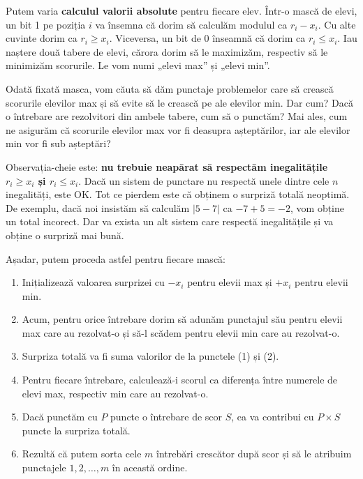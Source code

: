 \documentclass[../main.tex]{subfiles}
\begin{document}
Putem varia \textbf{calculul valorii absolute} pentru fiecare elev. Într-o mască de elevi, un bit 1 pe poziția $i$ va însemna că dorim să calculăm modulul ca $r_i - x_i$. Cu alte cuvinte dorim ca $r_i \geq x_i$. Viceversa, un bit de 0 înseamnă că dorim ca $r_i \leq x_i$. Iau naștere două tabere de elevi, cărora dorim să le maximizăm, respectiv să le minimizăm scorurile. Le vom numi „elevi max” și „elevi min”.

Odată fixată masca, vom căuta să dăm punctaje problemelor care să crească scorurile elevilor max și să evite să le crească pe ale elevilor min. Dar cum? Dacă o întrebare are rezolvitori din ambele tabere, cum să o punctăm? Mai ales, cum ne asigurăm că scorurile elevilor max vor fi deasupra așteptărilor, iar ale elevilor min vor fi sub așteptări?

Observația-cheie este: \textbf{nu trebuie neapărat să respectăm inegalitățile $r_i \geq x_i$ și $r_i \leq x_i$}. Dacă un sistem de punctare nu respectă unele dintre cele $n$ inegalități, este OK. Tot ce pierdem este că obținem o surpriză totală neoptimă. De exemplu, dacă noi insistăm să calculăm $|5 - 7|$ ca $-7 + 5 = -2$, vom obține un total incorect. Dar va exista un alt sistem care respectă inegalitățile și va obține o surpriză mai bună.

Așadar, putem proceda astfel pentru fiecare mască:

\begin{enumerate}
  \item Inițializează valoarea surprizei cu $-x_i$ pentru elevii max și $+x_i$ pentru elevii min.

  \item Acum, pentru orice întrebare dorim să adunăm punctajul său pentru elevii max care au rezolvat-o și să-l scădem pentru elevii min care au rezolvat-o.

  \item Surpriza totală va fi suma valorilor de la punctele (1) și (2).

  \item Pentru fiecare întrebare, calculează-i scorul ca diferența între numerele de elevi max, respectiv min care au rezolvat-o.

  \item Dacă punctăm cu $P$ puncte o întrebare de scor $S$, ea va contribui cu $P \times S$ puncte la surpriza totală.

  \item Rezultă că putem sorta cele $m$ întrebări crescător după scor și să le atribuim punctajele $1, 2, \dots, m$ în această ordine.
\end{enumerate}
\end{document}
